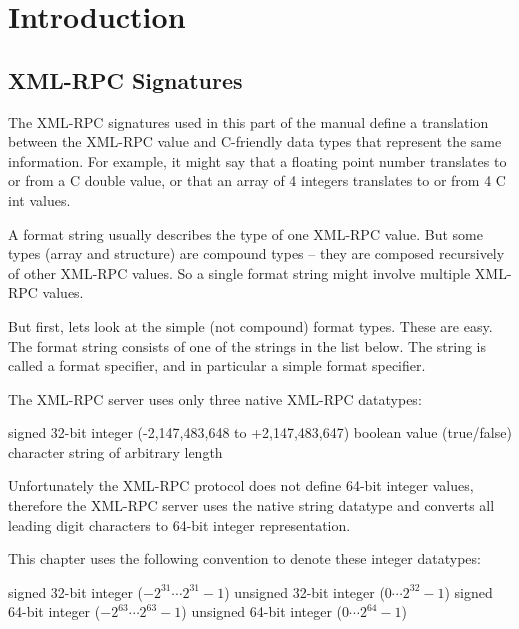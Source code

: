 \chapter{Introduction}
\label{ch:rpcref:intro}


\section{XML-RPC Signatures}

The XML-RPC signatures used in this part of the manual define a translation
between the XML-RPC value and C-friendly data types that represent the same
information. For example, it might say that a floating point number translates
to or from a C double value, or that an array of 4 integers translates to or
from 4 C int values.

A format string usually describes the type of one XML-RPC value. But some types
(array and structure) are compound types -- they are composed recursively of
other XML-RPC values. So a single format string might involve multiple XML-RPC
values.

But first, lets look at the simple (not compound) format types. These are easy.
The format string consists of one of the strings in the list below. The string
is called a format specifier, and in particular a simple format specifier.

The XML-RPC server uses only three native XML-RPC datatypes:

\begin{labeling}{}
 signed 32-bit integer (-2,147,483,648 to +2,147,483,647)
 boolean value (true/false)
 character string of arbitrary length
\end{labeling}

Unfortunately the XML-RPC protocol does not define 64-bit integer values,
therefore the XML-RPC server uses the native string datatype and converts all
leading digit characters to 64-bit integer representation.

This chapter uses the following convention to denote these integer datatypes:

\begin{labeling}{}
  signed 32-bit integer ($-2^{31} \cdots 2^{31}-1$)
 unsigned 32-bit integer ($0 \cdots 2^{32}-1$)
  signed 64-bit integer ($-2^{63} \cdots 2^{63}-1$)
 unsigned 64-bit integer ($0 \cdots 2^{64}-1$)
\end{labeling}

